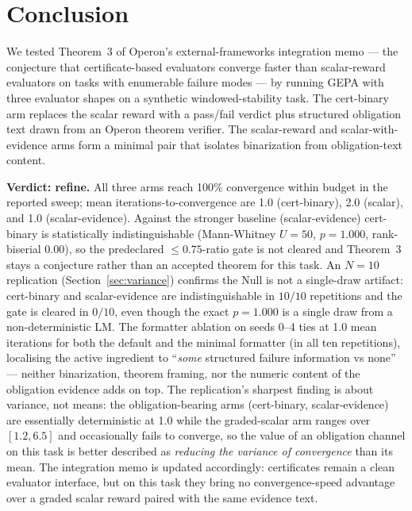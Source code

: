 \section{Conclusion}\label{sec:conclusion}

We tested Theorem~3 of Operon's external-frameworks integration
memo --- the conjecture that certificate-based evaluators converge
faster than scalar-reward evaluators on tasks with enumerable
failure modes --- by running GEPA with three evaluator shapes on a
synthetic windowed-stability task.  The cert-binary arm replaces
the scalar reward with a pass/fail verdict plus structured
obligation text drawn from an Operon theorem verifier.  The
scalar-reward and scalar-with-evidence arms form a minimal pair
that isolates binarization from obligation-text content.

\textbf{Verdict: refine.}  All three arms reach 100\% convergence
within budget in the reported sweep; mean iterations-to-convergence
are 1.0 (cert-binary), 2.0 (scalar), and 1.0 (scalar-evidence).
Against the stronger baseline (scalar-evidence) cert-binary is
statistically indistinguishable (Mann-Whitney $U=50$, $p=1.000$,
rank-biserial $0.00$), so the predeclared $\le 0.75$-ratio gate is
not cleared and Theorem~3 stays a conjecture rather than an accepted
theorem for this task.  An $N=10$ replication
(Section~\ref{sec:variance}) confirms the Null is not a single-draw
artifact: cert-binary and scalar-evidence are indistinguishable in
$10/10$ repetitions and the gate is cleared in $0/10$, even though
the exact $p=1.000$ is a single draw from a non-deterministic LM.
The formatter ablation on seeds 0--4 ties at 1.0 mean iterations for
both the default and the minimal formatter (in all ten repetitions),
localising the active ingredient to ``\emph{some} structured failure
information vs none'' --- neither binarization, theorem framing, nor
the numeric content of the obligation evidence adds on top.  The
replication's sharpest finding is about variance, not means: the
obligation-bearing arms (cert-binary, scalar-evidence) are
essentially deterministic at 1.0 while the graded-scalar arm ranges
over $[1.2, 6.5]$ and occasionally fails to converge, so the value
of an obligation channel on this task is better described as
\emph{reducing the variance of convergence} than its mean.  The
integration memo is updated accordingly: certificates remain a clean
evaluator interface, but on this task they bring no convergence-speed
advantage over a graded scalar reward paired with the same evidence
text.

